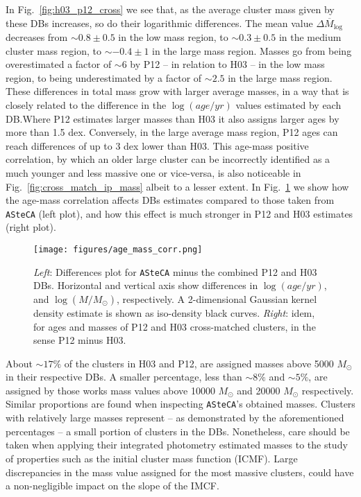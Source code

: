 \documentclass[draft]{aa}
\begin{document}
In Fig.~\ref{fig:h03_p12_cross} we see that, as the average cluster mass given
by these DBs increases, so do their logarithmic differences.
The mean value $\overline{\Delta M_{\log}}$ decreases from ${\sim}0.8\pm0.5$ in
the low mass region, to ${\sim}0.3\pm0.5$ in the medium cluster mass region, to
${\sim-}0.4\pm1$ in the large mass region. Masses go from being overestimated
a factor of ${\sim}6$ by P12 -- in relation to H03 -- in the low mass region, to
being underestimated by a factor of ${\sim}2.5$ in the large mass region.
%
These differences in total mass grow with larger average masses, in a way that
is closely related to the difference in the $\log(age/yr)$ values estimated by
each DB.\@ Where P12 estimates larger masses than H03 it also assigns larger
ages by more than 1.5 dex. Conversely, in the large average mass region, P12
ages can reach differences of up to 3 dex lower than H03.
%
This age-mass positive correlation, by which an older large cluster can be
incorrectly identified as a much younger and less massive one or vice-versa, is
also noticeable in Fig.~\ref{fig:cross_match_ip_mass} albeit to a lesser
extent. In Fig.~\ref{fig:age_mass_corr} we show how the age-mass correlation
affects DBs estimates compared to those taken from \texttt{ASteCA} (left plot),
and how this effect is much stronger in P12 and H03 estimates (right plot).

\begin{figure}
\centering
\texttt{[image: figures/age\_mass\_corr.png]}
\caption{\emph{Left}: Differences plot for \texttt{ASteCA} minus the combined
P12 and H03 DBs. Horizontal and vertical axis show differences in
$\log(age/yr)$, and $\log(M/M_{\odot})$, respectively.
A 2-dimensional Gaussian kernel density estimate is shown as iso-density black
curves.
\emph{Right}: idem, for ages and masses of P12 and H03 cross-matched clusters,
in the sense P12 minus H03.}
\label{fig:age_mass_corr}
\end{figure}

About ${\sim}17\%$ of the clusters in H03 and P12, are assigned masses
above 5000 $M_{\odot}$ in their respective DBs. A smaller percentage,
less than ${\sim}8\%$ and ${\sim}5\%$, are assigned by those works mass values
above 10000 $M_{\odot}$ and 20000 $M_{\odot}$ respectively. Similar proportions
are found when inspecting \texttt{ASteCA}'s obtained masses.
%
Clusters with relatively large masses represent -- as demonstrated by
the aforementioned percentages -- a small portion of clusters in the DBs.
Nonetheless, care should be taken when applying their integrated photometry
estimated masses to the study of properties such as the initial cluster
mass function (ICMF).
Large discrepancies in the mass value assigned for the most massive clusters, could
have a non-negligible impact on the slope of the IMCF.\@
\end{document}
